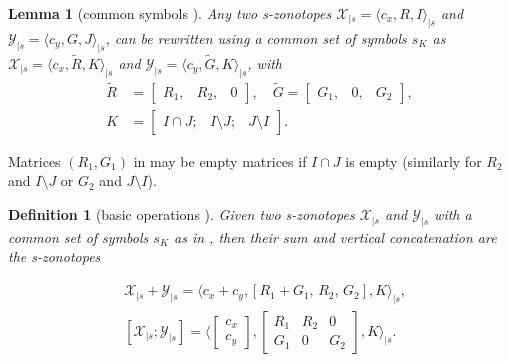 \documentclass[journal]{IEEEtran}
\newtheorem{mylemma}{Lemma}
\newtheorem{mydefinition}{Definition}
\begin{document}
\begin{mylemma}[common symbols \cite{combastel2020distributed}]\label{lem:common_id}
Any two s-zonotopes $\mathcal{X}_{|s} = \langle c_x, R,I\rangle_{|s}$ and $\mathcal{Y}_{|s} = \langle c_y, G, J\rangle_{|s} $, can be rewritten using a common set of symbols $s_K$ as $\mathcal{X}_{|s} = \langle c_x , \tilde{R}, K\rangle_{|s}$ and  $\mathcal{Y}_{|s} = \langle c_y, \tilde{G}, K\rangle_{|s}$, with 
\begin{equation}\label{eq:mergeid}
\begin{aligned}
      \tilde{R} &= \begin{bmatrix} R_1, & R_2, & 0 \end{bmatrix}, \quad 
      \tilde{G} = \begin{bmatrix} G_1, & 0, & G_2 \end{bmatrix}, \\
      K &= \begin{bmatrix}I\cap J; & I \setminus J; & J \setminus I \end{bmatrix}. 
\end{aligned}
\end{equation}
\end{mylemma}

Matrices $(R_1,G_1)$ in   may be empty matrices if $I\cap J$ is empty (similarly for $R_2$ and  $I \setminus J$ or $G_2$ and $J \setminus I$).

\begin{mydefinition}[basic operations \cite{combastel2020distributed}] \label{def:operations}
Given two s-zonotopes $\mathcal{X}_{|s}$ and $\mathcal{Y}_{|s}$ with a common set of symbols $s_K$ as in , then  their sum and vertical concatenation are the s-zonotopes 
\end{mydefinition}
\vspace*{-8mm}
\begin{align}
    & \mathcal{X}_{|s} + \mathcal{Y}_{|s} = \big\langle c_x+c_y,  [R_1+G_1, \, R_2, \, G_2], K \big\rangle_{|s}, \label{eq:sum} \\
    &[\mathcal{X}_{|s};\mathcal{Y}_{|s}] = \bigg \langle \begin{bmatrix}
c_x \\ c_y
\end{bmatrix}, \begin{bmatrix}
R_1 & R_2 & 0\\ G_1 & 0 & G_2
\end{bmatrix}, K\bigg \rangle_{|s}. \label{eq:vcat}
\end{align}
\end{document}
